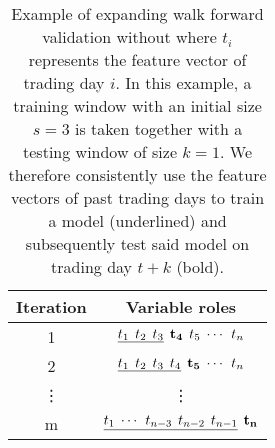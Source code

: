 \documentclass[preprint,1p, times,authoryear]{elsarticle}
\begin{document}
\begin{table}[!ht]
 \caption{Example of expanding walk forward validation without where $t_{i}$ represents the feature vector of trading day $i$. In this example, a training window with an initial size $s=3$ is taken together with a testing window of size $k=1$. We therefore consistently use the feature vectors of past trading days to train a model (underlined) and subsequently test said model on trading day $t+k$ (bold). } 
  \centering
  \begin{tabular}{cc}
    \toprule
    Iteration & Variable roles\\
    \midrule
     1 & $ \underline{t_{1} \hspace{1.5mm} t_{2} \hspace{1.5mm} t_{3}} \hspace{1.5mm} \mathbf{ t_{4} } \hspace{1.5mm} t_{5} \hspace{1.5mm} \dotsi \hspace{1.5mm} t_{n} $ \\
     2 & $ \underline{ t_{1} \hspace{1.5mm} t_{2} \hspace{1.5mm} t_{3} \hspace{1.5mm} t_{4}} \hspace{1.5mm} \mathbf{t_{5}}  \hspace{1.5mm} \dotsi \hspace{1.5mm} t_{n} $ \\
     \vdots & \vdots \\
     m & $ \underline{ t_{1} \hspace{1.5mm} \dotsi \hspace{1.5mm} t_{n-3} \hspace{1.5mm} t_{n-2} \hspace{1.5mm} t_{n-1}} \hspace{1.5mm} \mathbf{t_{n}} $ \\

    \bottomrule
  \end{tabular}
  \label{ch3:tab:ev}
\end{table}
\end{document}
